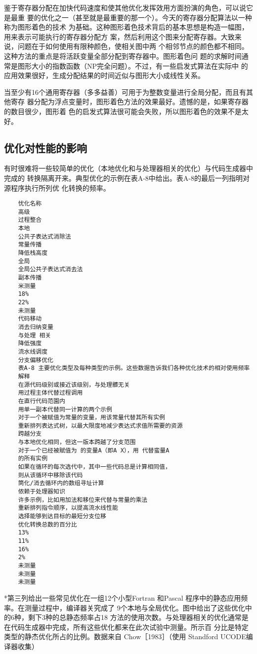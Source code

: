 鉴于寄存器分配在加快代码速度和使其他优化发挥效用方面扮演的角色，可以说它是最重
要的优化之一（甚至就是最重要的那一个）。今天的寄存器分配算法以一种称为图形着色的技术
为基础。这种图形着色技术背后的基本思想是构造一幅图，用来表示可能执行的寄存器分配方
案，然后利用这个图来分配寄存器。大致来说，问题在于如何使用有限种颜色，使相关图中两
个相邻节点的颜色都不相同。这种方法的重点是将活跃变量全部分配到寄存器中。图形着色问
题的求解时间通常是图形大小的指数函数（NP完全问题）。不过，有一些启发式算法在实际中
的应用效果很好，生成分配结果的时间近似与图形大小成线性关系。

当至少有16个通用寄存器（多多益善）可用于为整数变量进行全局分配，而且有其他寄存
器分配为浮点变量时，图形着色方法的效果最好。遗憾的是，如果寄存器的数目很少，图形着
色的启发式算法很可能会失败，所以图形着色的效果不是太好。

\subsection{优化对性能的影响}

有时很难将一些较简单的优化（本地优化和与处理器相关的优化）与代码生成器中完成的
转换隔离开来。典型优化的示例在表A-8中给出。表A-8的最后一列指明对源程序执行所列优
化转换的频率。

\begin{verbatim}
    忧化名称
    高级
    过程整合
    本地
    公共子表达式消除法
    常量传播
    降低栈高度
    全局
    全局公共子表达式消去法
    副本传播
    米测量
    18%
    22%
    未测量
    代码移动
    消去归纳变量
    与处理 相关
    降低强度
    流水线调度
    分支偏移优化
    表A-8 主要优化类型及每种类型的示例。这些数据告诉我们各种优化技术的相对使用频率
    解释
    在源代码级别或接近该级别，与处理髒无关
    用过程主体代替过程调用
    在直行代码范園内
    用单一副本代替同一计算的两个示例
    对于一个被赋值为常量的变量，用该常量代替其所有实例
    重新排列表达式树，以最大限度地减少表达式求值所需要的资源
    跨越分支
    与本地优化相同，但这一版本跨越了分支范围
    对于一个已经被賦值为 的变量A（即A X），用 代替蛮量A
    的所有实例
    如果在循环的每次选代中，其中一些代码总是计算相同值，
    则从该循环中移除该代码
    筒化/消去循环内的数组寻址计算
    侬赖于处理器知识
    许多示例，比如用加法和移位来代替与常量的乘法
    重新排列指令顺序，以提高流水线性能
    选择能够到达目标的最短分支位移
    优化转换总数的百分比
    13%
    11%
    16%
    2%
    未测量
    未测量
    未测量
\end{verbatim}
*第三列给出一些常见优化在一组12个小型Fortran 和Pascal 程序中的静态应用频率。在测量过程中，编译器关究成了
9个本地与全局优化。图中给出了这些优化中的6种，剩下3种的总静态频率占18%
方法的使用次数。与处理器相关的优化通常是在代码生成器中完成，所有这些优化都来在此次试验中测量。所示百
分比是特定类型的静杰优化所占的比例。数据来自 Chow［1983］（使用 Standford UCODE编译器收集）

